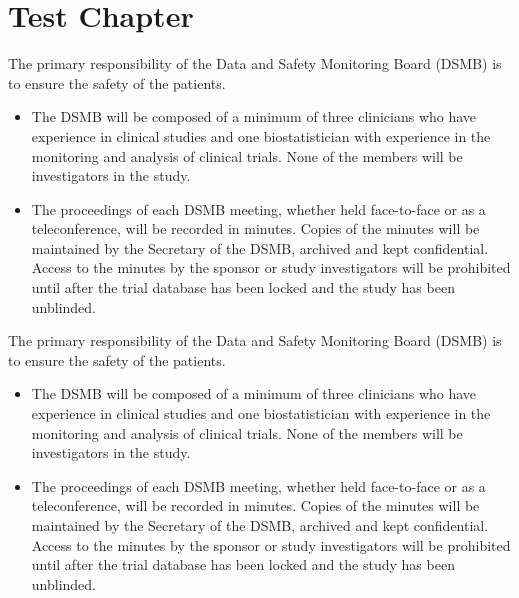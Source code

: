 %



\chapter{Test Chapter}
\minitoc
{}


The primary responsibility of the Data and Safety Monitoring Board (DSMB) is to ensure the safety of the patients.
\begin{itemize}
	\item The DSMB will be composed of a minimum of three clinicians who have experience in clinical studies  and one biostatistician with experience in the monitoring and analysis of clinical trials.  None of the members will be investigators in the study.
	\item The proceedings of each DSMB meeting, whether held face-to-face or as a teleconference, will be recorded in minutes.  Copies of the minutes will be maintained by the Secretary of the DSMB, archived and kept confidential.  Access to the minutes by the sponsor or study investigators will be prohibited until after the trial database has been locked and the study has been unblinded.
\end{itemize}

The primary responsibility of the Data and Safety Monitoring Board (DSMB) is to ensure the safety of the patients.
\begin{itemize}
	\item The DSMB will be composed of a minimum of three clinicians who have experience in clinical studies  and one biostatistician with experience in the monitoring and analysis of clinical trials.  None of the members will be investigators in the study.
	\item The proceedings of each DSMB meeting, whether held face-to-face or as a teleconference, will be recorded in minutes.  Copies of the minutes will be maintained by the Secretary of the DSMB, archived and kept confidential.  Access to the minutes by the sponsor or study investigators will be prohibited until after the trial database has been locked and the study has been unblinded.
\end{itemize}

